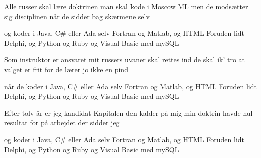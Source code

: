 Alle russer skal lære doktrinen
man skal kode i Moscow ML
men de modsætter sig disciplinen
når de sidder bag skærmene selv

og koder i Java, C\# eller Ada
selv Fortran og Matlab, og HTML
Foruden lidt Delphi, og Python og Ruby
og Visual Basic med mySQL

Som instruktor er ansvaret mit
russers uvaner skal rettes ind
de skal ik' tro at valget er frit
for de lærer jo ikke en pind

når de koder i Java, C\# eller Ada
selv Fortran og Matlab, og HTML
Foruden lidt Delphi, og Python og Ruby
og Visual Basic med mySQL

Efter tolv år er jeg kandidat
Kapitalen den kalder på mig
min doktrin havde nul resultat
for på arbejdet der sidder jeg

og koder i Java, C\# eller Ada
selv Fortran og Matlab, og HTML
Foruden lidt Delphi, og Python og Ruby
og Visual Basic med mySQL
